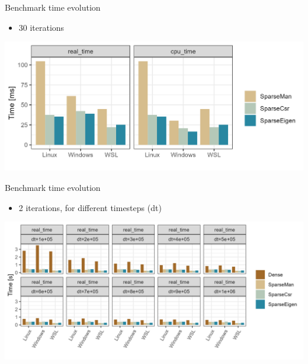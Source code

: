 \documentclass[aspectratio=169,xcolor=dvipsnames]{beamer}
\begin{document}
\begin{frame}{Benchmark time evolution}
   
    \begin{itemize}
        \item 30 iterations
    \end{itemize}
    
    \begin{center}
   \includegraphics[width=0.8\linewidth]{timeevolution_bench_result2.png}
   \end{center}
   
\end{frame}


\begin{frame}{Benchmark time evolution}
   
    \begin{itemize}
        \item 2 iterations, for different timesteps (dt)
    \end{itemize}
    
    \begin{center}
   \includegraphics[width=1\linewidth]{ode_bench_result.png}
   \end{center}
   
\end{frame}

\end{document}
